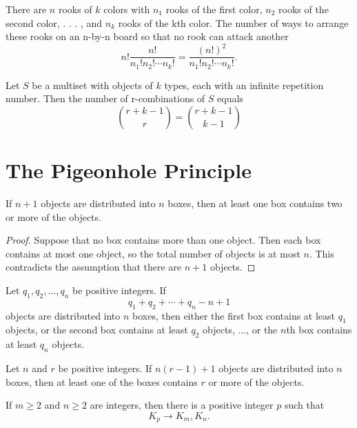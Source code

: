 \begin{theorem}
    \label{thm:2.4.4}
    There are $n$ rooks of $k$ colors with $n_1$ rooks of the first color, $n_2$ rooks of the second color, . . . , and $n_k$ rooks of the kth color. The number of ways to arrange these rooks on an n-by-n board so that no rook can attack another 
    \[n!\frac{n!}{n_1!n_2!\cdots n_k!}=\frac{(n!)^2}{n_1!n_2!\cdots n_k!}.\]
\end{theorem}

\begin{theorem}
    \label{thm:2.5.1}
    Let $S$ be a multiset with objects of $k$ types, each with an infinite repetition number. Then the number of r-combinations of $S$ equals
    \[\binom{r+k-1}{r}=\binom{r+k-1}{k-1}\]
\end{theorem}

\chapter{The Pigeonhole Principle}

\begin{theorem}
    \label{thm:3.1.1}
    \leanok
   If $n + 1$ objects are distributed into $n$ boxes, then at least one box 
contains two or more of the objects.
\end{theorem} 

\begin{proof}
  \leanok
  Suppose that no box contains more than one object. Then each box contains at most one object, so the total number of objects is at most $n$. This contradicts the assumption that there are $n + 1$ objects.
\end{proof}

\begin{theorem}
    \label{thm:3.2.1}
   Let $q_1, q_2, . .. ,q_n$ be positive integers. If
   \[q_1 + q_2 + \cdots + q_n - n + 1\]
objects are distributed into $n$ boxes, then either the first box contains at least $q_1$ objects, or the second box contains at least $q_2$ objects, $\dots$, or the $n$th box contains at least $q_n$ objects.
\end{theorem} 

\begin{corollary}
    \label{cor:3.2.2}
Let $n$ and $r$ be positive integers. If $n(r-1) + 1$
objects are distributed into $n$ boxes, then at least one of the boxes contains $r$ or more of the objects.
\end{corollary}

\begin{theorem}
    \label{thm:3.3.1}
If $m \geq 2$ and $n \geq 2$ are integers, then there is a positive integer $p$ such that
\[K_p \rightarrow K_m, K_n.\]
\end{theorem} 

